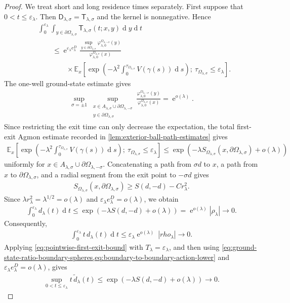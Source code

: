 \documentclass[a4paper,10pt]{article}
\numberwithin{equation}{section}
\theoremstyle{plain}
\theoremstyle{plain}
\theoremstyle{plain}
\theoremstyle{plain}
\theoremstyle{plain}
\theoremstyle{remark}
\theoremstyle{definition}
\newcommand{\ee}{\operatorname{e}}
\newcommand{\EE}{\mathbb{E}}
\newcommand{\dif}{\operatorname{d}\!} %
\newcommand{\vf}{\varphi}
\newcommand{\abs}[1]{\left\lvert#1\right\rvert}
\newcommand{\eql}[1]{\begin{align}#1\end{align}}
\newcommand{\br}[1]{\left(#1\right)}
\begin{document}
\begin{proof}
We treat short and long residence times separately. First suppose that $0<t\leq\varepsilon_\lambda$. Then $\mathsf D_{\lambda,\sigma}=\mathsf T_{\lambda,\sigma}$ and the kernel is nonnegative. Hence
\begin{align}
&\int_0^{\varepsilon_\lambda}
\int_{y\in\partial\Omega_{\lambda,\sigma}}
\mathsf T_{\lambda,\sigma}(t;x,y)\dif{y}\dif{t}
\nonumber\\
&\qquad\leq
\ee^{\varepsilon_\lambda e_\lambda^D}
\frac{
\displaystyle
\sup_{y\in\partial\Omega_{\lambda,\sigma}}
\vf_{\lambda,0}^{\Omega_{\lambda,-\sigma}}(y)
}{
\vf_{\lambda,0}^{\Omega_{\lambda,\sigma}}(x)
}
\nonumber\\
&\qquad\qquad\times
\EE_x\left[
\exp\left(
-\lambda^2
\int_0^{\tau_{\Omega_{\lambda,\sigma}}}
V(\gamma(s))\dif{s}
\right);
\ \tau_{\Omega_{\lambda,\sigma}}\leq\varepsilon_\lambda
\right].
\label{eq:short-defect-first-exit}
\end{align}
The one-well ground-state estimate gives
\eql{
\sup_{\sigma=\pm1}
\sup_{\substack{
x\in A_{\lambda,\sigma}\cup\partial\Omega_{\lambda,-\sigma}\\
y\in\partial\Omega_{\lambda,\sigma}
}}
\frac{
\vf_{\lambda,0}^{\Omega_{\lambda,-\sigma}}(y)
}{
\vf_{\lambda,0}^{\Omega_{\lambda,\sigma}}(x)
}
=
\ee^{o(\lambda)}.
\label{eq:ground-state-ratio-boundary-spheres}
}
Since restricting the exit time can only decrease the expectation, the total first-exit Agmon estimate recorded in \cref{lem:exterior-ball-path-estimates} gives
\eql{
\EE_x\left[
\exp\left(
-\lambda^2
\int_0^{\tau_{\Omega_{\lambda,\sigma}}}
V(\gamma(s))\dif{s}
\right);
\ \tau_{\Omega_{\lambda,\sigma}}\leq\varepsilon_\lambda
\right]
\leq
\exp\left(
-\lambda
S_{\Omega_{\lambda,\sigma}}
\br{x,\partial\Omega_{\lambda,\sigma}}
+o(\lambda)
\right)
\label{eq:short-defect-agmon-upper}
}
uniformly for $x\in A_{\lambda,\sigma}\cup\partial\Omega_{\lambda,-\sigma}$. Concatenating a path from $\sigma d$ to $x$, a path from $x$ to $\partial\Omega_{\lambda,\sigma}$, and a radial segment from the exit point to $-\sigma d$ gives
\eql{
S_{\Omega_{\lambda,\sigma}}
\br{x,\partial\Omega_{\lambda,\sigma}}
\geq
S(d,-d)-Cr_\lambda^2.
\label{eq:boundary-to-boundary-action-lower}
}
Since $\lambda r_\lambda^2=\lambda^{1/2}=o(\lambda)$ and $\varepsilon_\lambda e_\lambda^D=o(\lambda)$, we obtain
\eql{
\int_0^{\varepsilon_\lambda}d_\lambda(t)\dif{t}
\leq
\exp\br{-\lambda S(d,-d)+o(\lambda)}
=
\ee^{o(\lambda)}\abs{\rho_\lambda}
\longrightarrow0.
\label{eq:short-defect-L1}
}
Consequently,
\eql{
\int_0^{\varepsilon_\lambda}t\,d_\lambda(t)\dif{t}
\leq
\varepsilon_\lambda\ee^{o(\lambda)}\ \abs{rho_\lambda}
\longrightarrow0.
\label{eq:short-defect-first-moment}
}
Applying \cref{eq:pointwise-first-exit-bound} with
$T_\lambda=\varepsilon_\lambda$, and then using
\cref{eq:ground-state-ratio-boundary-spheres,eq:boundary-to-boundary-action-lower}
and $\varepsilon_\lambda e_\lambda^D=o(\lambda)$, gives
\eql{
\sup_{0<t\leq\varepsilon_\lambda}
t\,\widetilde d_\lambda(t)
\leq
\exp\br{-\lambda S(d,-d)+o(\lambda)}
\longrightarrow0.
\label{eq:short-defect-pointwise}
}


\end{proof}
\end{document}
